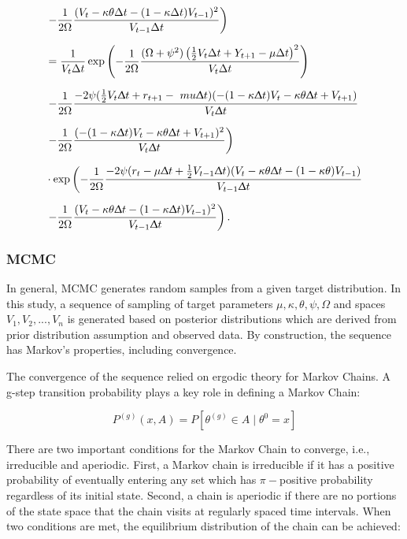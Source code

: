 \documentclass[12pt,a4paper]{article}
\numberwithin{equation}{section}
\begin{document}
\begin{align*}
& \left. - \frac{1}{2\Omega} \frac{(V_t-\kappa \theta \Delta t - (1-\kappa \Delta t)V_{t-1})^2}{V_{t-1} \Delta t}\right)\\[0.6em]
&= \frac{1}{V_t \Delta t} \exp \left( - \frac{1}{2 \Omega} \frac{(\Omega + \psi^2)\left(\frac{1}{2} V_t \Delta t + Y_{t+1} - \mu \Delta t\right)^2}{V_t \Delta t} \right) \\[0.6em]
& \left. -\frac{1}{2 \Omega} \frac{-2\psi (\frac{1}{2}V_t \Updelta t + r_{t+1} -\ mu \Updelta t)(-(1-\kappa \Updelta t)V_t -\kappa \theta \Updelta t + V_{t+1})}{V_t \Updelta t} \right. \\[0.6em]
& \left. -\frac{1}{2 \Omega} \frac{(-(1-\kappa \Updelta t) V_t - \kappa \theta \Updelta t + V_{t+1})^2}{V_t \Updelta t} \right) \\[0.6em]
& \cdot \exp \left( - \frac{1}{2 \Omega} \frac{-2 \psi (r_t - \mu \Updelta t + \frac{1}{2}V_{t-1} \Updelta t)(V_t - \kappa \theta \Updelta t - (1-\kappa \theta)V_{t-1})}{V_{t-1} \Updelta t} \right. \\[0.6em]
& \left. -\frac{1}{2 \Omega} \frac{(V_t - \kappa \theta \Updelta t - (1-\kappa\Updelta t)V_{t-1})^2}{V_{t-1}\Updelta t}\right).
\end{align*}

\subsubsection{MCMC}

In general, MCMC generates random samples from a given target distribution. In this study, a sequence of sampling of target parameters $\mu, \kappa, \theta, \psi, \Omega$ and spaces $V_1, V_2, ..., V_n$ is generated based on posterior distributions which are derived from prior distribution assumption and observed data. By construction, the sequence has Markov's properties, including convergence.

The convergence of the sequence relied on ergodic theory for Markov Chains. A g-step transition probability plays a key role in defining a Markov Chain:

\[P^{(g)} (x, A) = P[\theta^{(g)} \in A \mid \theta^0 = x]\]

There are two important conditions for the Markov Chain to converge, i.e., irreducible and aperiodic. First, a Markov chain is irreducible if it has a positive probability of eventually entering any set which has $\pi-$positive probability regardless of its initial state. Second, a chain is aperiodic if there are no portions of the state space that the chain visits at regularly spaced time intervals. When two conditions are met, the equilibrium distribution of the chain can be achieved:
\end{document}
